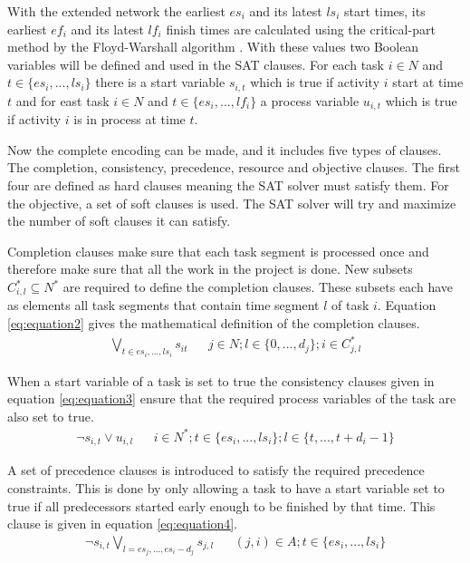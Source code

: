 With the extended network the earliest \(es_i\) and its latest \(ls_i\) start times, its earliest \(ef_i\) and its latest \(lf_i\) finish times are calculated using the critical-part method by the Floyd-Warshall algorithm \cite{RN53}. With these values two Boolean variables will be defined and used in the SAT clauses. For each task \(i \in N\) and \(t \in \{es_i,...,ls_i\}\) there is a start variable \(s_{i,t}\) which is true if activity \(i\) start at time \(t\) and for east task \(i \in N\) and \(t \in \{es_i,...,lf_i\}\) a process variable \(u_{i,t}\) which is true if activity \(i\) is in process at time \(t\).

Now the complete encoding can be made, and it includes five types of clauses. The completion, consistency, precedence, resource and objective clauses. The first four are defined as hard clauses meaning the SAT solver must satisfy them. For the objective, a set of soft clauses is used. The SAT solver will try and maximize the number of soft clauses it can satisfy.

Completion clauses make sure that each task segment is processed once and therefore make sure that all the work in the project is done. New subsets \(C^*_{i,l} \subseteq N^*\) are required to define the completion clauses. These subsets each have as elements all task segments that contain time segment \(l\) of task \(i\). Equation \ref{eq:equation2} gives the mathematical definition of the completion clauses.
\begin{align}\label{eq:equation2}
\bigvee_{t\in {es_i,...,ls_i}} s_{it}   &&  j\in N; l\in \{0,...,d_j\}; i\in C^*_{j,l}
\end{align}

When a start variable of a task is set to true the consistency clauses given in equation \ref{eq:equation3} ensure that the required process variables of the task are also set to true.
\begin{align}\label{eq:equation3}
\neg s_{i,t} \vee u_{i,l}   &&  i\in N^*;t\in \{es_i,...,ls_i\};l\in \{t,...,t+d_i-1\}
\end{align}

A set of precedence clauses is introduced to satisfy the required precedence constraints. This is done by only allowing a task to have a start variable set to true if all predecessors started early enough to be finished by that time. This clause is given in equation \ref{eq:equation4}.
\begin{align}\label{eq:equation4}
\neg s_{i,t} \bigvee_{l=es_j,...,es_i-d_j} s_{j,l}  &&  (j,i)\in A; t\in\{es_i,...,ls_i\}
\end{align}

